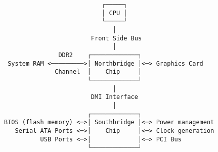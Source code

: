 \documentclass[varwidth=41em,crop]{standalone}
\begin{document}
\begin{verbatim}
                           ┌─────┐
                           │ CPU │
                           └─────┘
                              │
                        Front Side Bus
                              │
               DDR2    ┌─────────────┐
 System RAM <─────────>│ Northbridge │<─> Graphics Card
              Channel  │    Chip     │
                       └─────────────┘
                              │
                        DMI Interface
                              │
                       ┌─────────────┐
BIOS (flash memory) <─>│ Southbridge │<─> Power management
   Serial ATA Ports <─>│    Chip     │<─> Clock generation
          USB Ports <─>│             │<─> PCI Bus
                       └─────────────┘
\end{verbatim}
\end{document}
